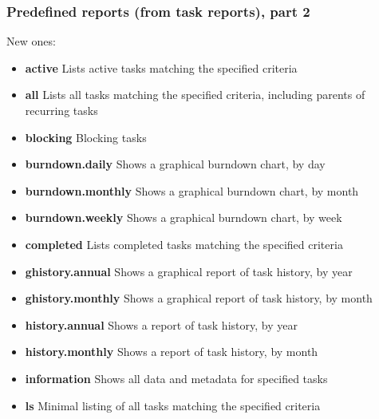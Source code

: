 \documentclass[t]{beamer}
\begin{document}
\begin{frame}[fragile]\frametitle{Predefined reports (from task reports), part 2}
    New ones:

    \begin{itemize}
        \item \textbf{active}           Lists active tasks matching the specified criteria
        \item \textbf{all}              Lists all tasks matching the specified criteria, including parents of recurring tasks
        \item \textbf{blocking}         Blocking tasks
        \item \textbf{burndown.daily}   Shows a graphical burndown chart, by day
        \item \textbf{burndown.monthly} Shows a graphical burndown chart, by month
        \item \textbf{burndown.weekly}  Shows a graphical burndown chart, by week
        \item \textbf{completed}        Lists completed tasks matching the specified criteria
        \item \textbf{ghistory.annual}  Shows a graphical report of task history, by year
        \item \textbf{ghistory.monthly} Shows a graphical report of task history, by month
        \item \textbf{history.annual}   Shows a report of task history, by year
        \item \textbf{history.monthly}  Shows a report of task history, by month
        \item \textbf{information}      Shows all data and metadata for specified tasks
        \item \textbf{ls}               Minimal listing of all tasks matching the specified criteria
    \end{itemize}
\end{frame}
\end{document}
